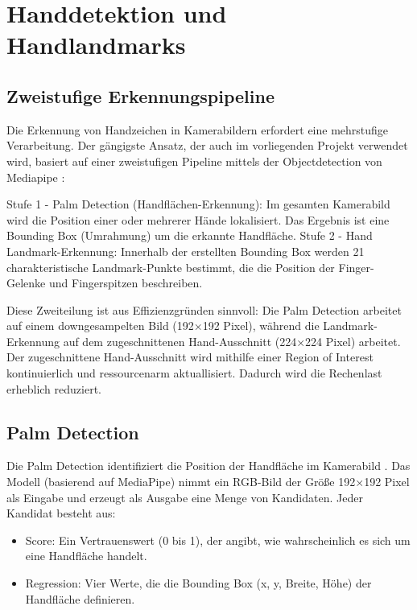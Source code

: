 \section{Handdetektion und Handlandmarks}\label{sec:handdetektion}

\subsection{Zweistufige Erkennungspipeline}\label{sub:erkennungspipeline}

Die Erkennung von Handzeichen in Kamerabildern erfordert eine mehrstufige Verarbeitung. Der gängigste Ansatz, der auch im vorliegenden Projekt verwendet wird, basiert auf einer zweistufigen Pipeline mittels der Objectdetection von Mediapipe \cite{lugaresiMediaPipeFrameworkPerceiving, zhang3DGeometricFeatures2025, OnDeviceRealTimeHand}:

Stufe 1 - Palm Detection (Handflächen-Erkennung): Im gesamten Kamerabild wird die Position einer oder mehrerer Hände lokalisiert. Das Ergebnis ist eine Bounding Box (Umrahmung) um die erkannte Handfläche.
Stufe 2 - Hand Landmark-Erkennung: Innerhalb der erstellten Bounding Box werden 21 charakteristische Landmark-Punkte bestimmt, die die Position der Finger-Gelenke und Fingerspitzen beschreiben.

Diese Zweiteilung ist aus Effizienzgründen sinnvoll: Die Palm Detection arbeitet auf einem downgesampelten Bild (192×192 Pixel), während die Landmark-Erkennung auf dem zugeschnittenen Hand-Ausschnitt (224×224 Pixel) arbeitet. Der zugeschnittene Hand-Ausschnitt wird mithilfe einer Region of Interest kontinuierlich und ressourcenarm aktuallisiert. Dadurch wird die Rechenlast erheblich reduziert.

\subsection{Palm Detection}\label{sub:palm-detection}

Die Palm Detection identifiziert die Position der Handfläche im Kamerabild \cite{OnDeviceRealTimeHand}. Das Modell (basierend auf MediaPipe) nimmt ein RGB-Bild der Größe 192×192 Pixel als Eingabe und erzeugt als Ausgabe eine Menge von Kandidaten. Jeder Kandidat besteht aus:

\begin{itemize}
    \item Score: Ein Vertrauenswert (0 bis 1), der angibt, wie wahrscheinlich es sich um eine Handfläche handelt.
    \item Regression: Vier Werte, die die Bounding Box (x, y, Breite, Höhe) der Handfläche definieren.
\end{itemize}

